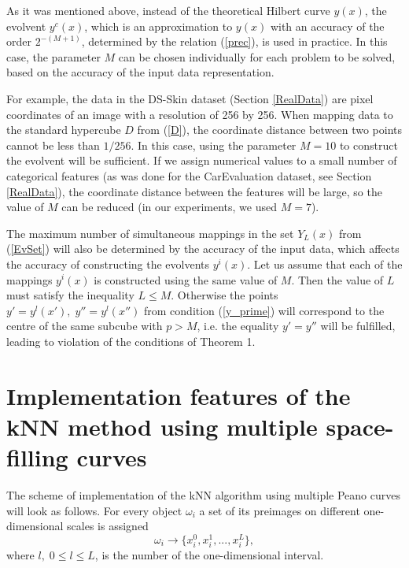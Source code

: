 \documentclass[entropy,article,submit,moreauthors,pdftex]{Definitions/mdpi}
\begin{document}
\begin{paracol}{2}
\linenumbers
\switchcolumn

\textcolor[rgb]{1,0,0}{As it was mentioned above, instead of the theoretical Hilbert curve $y(x)$, the evolvent $y^c(x)$, which is an approximation to $y(x)$ with an accuracy of the order $2^{-(M+1)}$, determined by the relation  (\ref{prec}), is used in practice. In this case, the parameter $M$ can be chosen individually for each problem to be solved, based on the accuracy of the input data representation.}

\textcolor[rgb]{1,0,0}{For example, the data in the DS-Skin dataset (Section \ref{RealData}) are pixel coordinates of an image with a resolution of 256 by 256. When mapping data to the standard hypercube $D$ from (\ref{D}), the coordinate distance between two points cannot be less than $1/256$. In this case, using the parameter $M=10$ to construct the evolvent will be sufficient.
If we assign numerical values to a small number of categorical features (as was done for the CarEvaluation dataset, see Section \ref{RealData}), the  coordinate distance between the features will be large, so the value of $M$ can be reduced (in our experiments, we used $M=7$).}

\textcolor[rgb]{1,0,0}{The maximum number of simultaneous mappings in the set $Y_L(x)$ from (\ref{EvSet}) will also be determined by the accuracy of the input data, which affects the accuracy of constructing the evolvents $y^i(x)$.
Let us assume that each of the mappings  $y^i(x)$ is constructed using the same value of $M$. Then the value of $L$ must satisfy the inequality $L \leq M$. Otherwise the points $y' = y^l(x'),\; y''=y^l(x'')$ from condition (\ref{y_prime}) will correspond to the centre of the same subcube with $p>M$, i.e. the equality  $y' = y''$ will be fulfilled, leading to violation of the conditions of Theorem 1.} 

\section{Implementation features of the kNN method using multiple space-filling curves}\label{knnme}

The scheme of implementation of the kNN algorithm using multiple Peano curves will look as follows.
For every object $\omega_i$ a set of its preimages on different one-dimensional scales is assigned 
\[
\omega_i \rightarrow \{ x_i^0, x_i^1, ..., x_i^L \},
\] 
where $l, \; 0 \leq l \leq L$, is the number of the one-dimensional interval.


\end{paracol}
\end{document}
